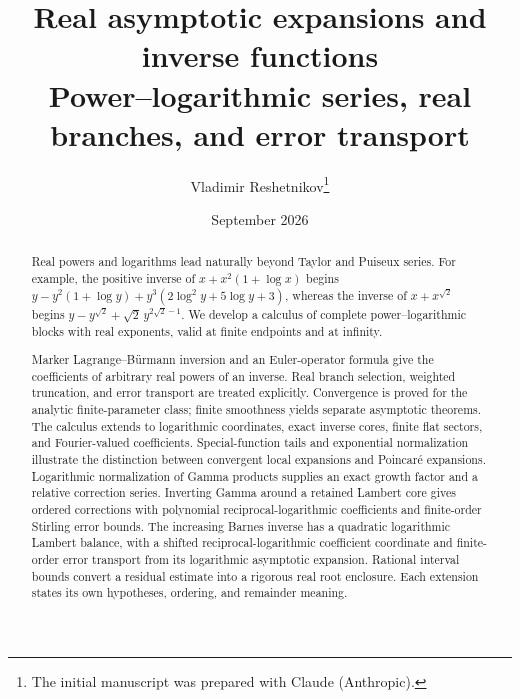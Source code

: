 \documentclass[11pt,a4paper]{article}
\title{Real asymptotic expansions and inverse functions\\[0.4em]
\large Power--logarithmic series, real branches, and error transport}
\author{Vladimir Reshetnikov\thanks{The initial manuscript was prepared with Claude (Anthropic).}}
\date{September 2026}
\numberwithin{equation}{section}
\theoremstyle{plain}
\theoremstyle{definition}
\theoremstyle{remark}
\begin{document}
\maketitle

\begin{abstract}
Real powers and logarithms lead naturally beyond Taylor and Puiseux series.
For example, the positive inverse of $x+x^2(1+\log x)$ begins
$y-y^2(1+\log y)+y^3(2\log^2y+5\log y+3)$, whereas the inverse of
$x+x^{\sqrt2}$ begins $y-y^{\sqrt2}+\sqrt2\,y^{2\sqrt2-1}$.
We develop a calculus of complete power--logarithmic blocks with real
exponents, valid at finite endpoints and at infinity.

Marker Lagrange--B\"urmann inversion and an Euler-operator formula give the
coefficients of arbitrary real powers of an inverse. Real branch selection,
weighted truncation, and error transport are treated explicitly. Convergence
is proved for the analytic finite-parameter class; finite smoothness yields
separate asymptotic theorems. The calculus extends to logarithmic coordinates,
exact inverse cores, finite flat sectors, and Fourier-valued coefficients.
Special-function tails and exponential normalization illustrate the
distinction between convergent local expansions and Poincar\'e expansions.
Logarithmic normalization of Gamma products supplies an exact growth factor
and a relative correction series. Inverting Gamma around a retained Lambert
core gives ordered corrections with polynomial reciprocal-logarithmic
coefficients and finite-order Stirling error bounds.
The increasing Barnes inverse has a quadratic logarithmic Lambert balance,
with a shifted reciprocal-logarithmic coefficient coordinate and finite-order
error transport from its logarithmic asymptotic expansion.
Rational interval bounds convert a residual
estimate into a rigorous real root enclosure. Each extension states its
own hypotheses, ordering, and remainder meaning.
\end{abstract}

\tableofcontents































\end{document}
